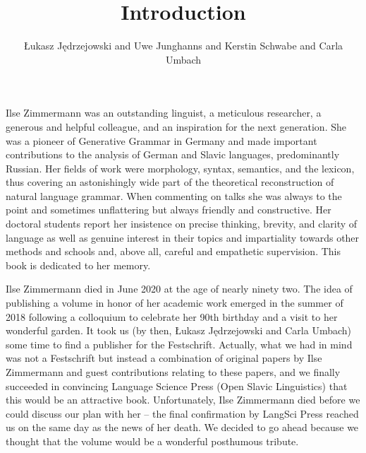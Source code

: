 \documentclass[output=paper,colorlinks,citecolor=brown]{langscibook}
\title{Introduction}
\author{Łukasz Jędrzejowski\affiliation{University of Agder} and Uwe Junghanns\affiliation{University of Göttingen} and Kerstin Schwabe\affiliation{Leibniz Institute for the German Language, Mannheim} and Carla Umbach\affiliation{University of Cologne}}
\begin{document}
\maketitle

%

\noindent Ilse Zimmermann was an outstanding linguist, a meticulous researcher, a generous and helpful colleague, and an inspiration for  the next generation. She was a pioneer of Generative Grammar in Germany and made important contributions to the analysis of German and Slavic languages, predominantly Russian. Her fields of work were morphology, syntax, semantics, and the lexicon, thus covering an astonishingly wide part of the theoretical reconstruction of natural language grammar. When commenting on talks she was always to the point and sometimes unflattering but always friendly and constructive. Her doctoral students report her insistence on precise thinking, brevity, and clarity of language as well as genuine interest in their topics and impartiality towards other \mbox{methods} and schools and, above all, careful and empathetic supervision. This book is dedicated to her memory.

Ilse Zimmermann died in June 2020 at the age of nearly ninety two. The idea of publishing a volume in honor of her academic work emerged in the summer of 2018 following a colloquium to celebrate her 90th birthday and a visit to her wonderful garden. It took us (by then, Łukasz Jędrzejowski and Carla Umbach) some time to find a publisher for the Festschrift. Actually, what we had in mind was not a Festschrift but instead a combination of original papers by Ilse Zimmermann and guest contributions relating to these papers, and we finally succeeded in convincing Language Science Press (Open Slavic Linguistics) that this would be an attractive book. Unfortunately, Ilse Zimmermann died before we could discuss our plan with her -- the final confirmation by LangSci Press reached us on the same day as the news of her death. We decided to go ahead because we thought that the volume would be a wonderful posthumous tribute.
\end{document}
